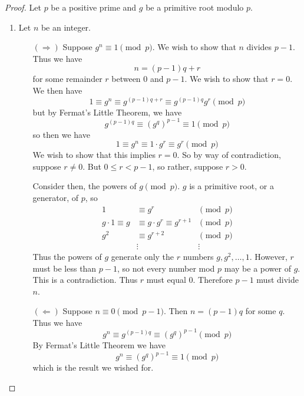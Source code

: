 \documentclass[12pt]{article}
\begin{document}
    \begin{proof} Let $p$ be a positive prime and $g$ be a primitive root modulo $p$.
        \begin{enumerate}
            \item Let $n$ be an integer.
            \begin{itemize}
                \item[$(\Longrightarrow)$] Suppose $g^n \equiv 1 \pmod{p}$. We wish to show that $n$ divides $p - 1$. Thus we have
                $$n = (p - 1)q + r$$
                for some remainder $r$ between $0$ and $p - 1$. We wish to show that $r = 0$. We then have
                $$1 \equiv g^n \equiv g^{(p - 1)q + r} \equiv g^{(p - 1)q}g^r \pmod{p}$$
                but by Fermat's Little Theorem, we have
                $$g^{(p - 1)q} \equiv (g^q)^{p - 1} \equiv 1 \pmod{p}$$
                so then we have
                $$1 \equiv g^n \equiv 1 \cdot g^r \equiv g^r \pmod{p}$$
                We wish to show that this implies $r = 0$. So by way of contradiction, suppose $r \neq 0$. But $0 \leq r < p - 1$, so rather, suppose $r > 0$.

                Consider then, the powers of $g \pmod{p}$. $g$ is a primitive root, or a generator, of $p$, so
                \begin{align*}
                    1 &\equiv g^r &\pmod{p}\\
                    g \cdot 1\equiv g &\equiv g \cdot g^r \equiv g^{r + 1} &\pmod{p}\\
                    g^2 &\equiv g^{r + 2} &\pmod{p}\\
                    &\vdots &\vdots
                \end{align*}
                Thus the powers of $g$ generate only the $r$ numbers $g, g^2, \dots, 1$. However, $r$ must be less than $p - 1$, so not every number mod $p$ may be a power of $g$. This is a contradiction. Thus $r$ must equal $0$. Therefore $p - 1$ must divide $n$.

                \item[$(\Longleftarrow)$] Suppose $n \equiv 0 \pmod{p - 1}$. Then $n = (p - 1)q$ for some $q$. Thus we have
                $$g^n \equiv g^{(p - 1)q} \equiv {(g^q)}^{p - 1} \pmod{p}$$
                By Fermat's Little Theorem we have
                $$g^n \equiv {(g^q)}^{p - 1} \equiv 1 \pmod{p}$$
                which is the result we wished for.
            \end{itemize}


\end{enumerate}
\end{proof}
\end{document}
